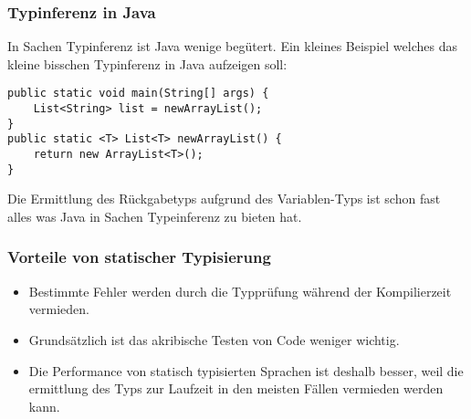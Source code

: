 \subsubsection{Typinferenz in Java}
In Sachen Typinferenz ist Java wenige beg\"utert. Ein kleines Beispiel welches das kleine bisschen Typinferenz in Java aufzeigen soll:

\begin{lstlisting}[caption=Typeinferenz in Java]
public static void main(String[] args) {
	List<String> list = newArrayList();
}
public static <T> List<T> newArrayList() {
	return new ArrayList<T>();
}
\end{lstlisting}
Die Ermittlung des R\"uckgabetyps aufgrund des Variablen-Typs ist schon fast alles was Java in Sachen Typeinferenz zu bieten hat.

\subsubsection{Vorteile von statischer Typisierung}
\begin{itemize}
\item Bestimmte Fehler werden durch die Typpr\"ufung w\"ahrend der Kompilierzeit vermieden.
\item Grunds\"atzlich ist das akribische Testen von Code weniger wichtig. 
\item Die Performance von statisch typisierten Sprachen ist deshalb besser, weil die ermittlung des Typs zur Laufzeit in den meisten F\"allen vermieden werden kann.
\end{itemize}

